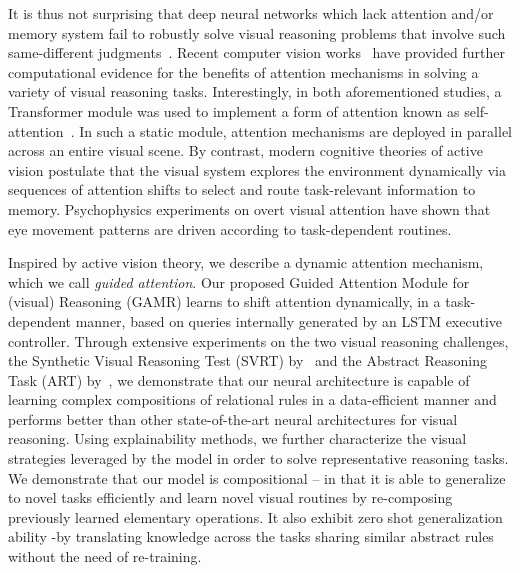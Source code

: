 It is thus not surprising that deep neural networks which lack attention and/or memory system fail to robustly solve visual reasoning problems that involve such same-different judgments~\citep{kim2018not}. Recent computer vision works~\citep{messina2021recurrent,vaishnav2021understanding} have provided further computational evidence for the benefits of attention mechanisms in solving a variety of visual reasoning tasks. Interestingly, in both aforementioned studies, a Transformer module was used to implement a form of attention known as self-attention~\citep{cheng2016long,parikh-etal-2016-decomposable}. In such a static module, attention mechanisms are deployed in parallel across an entire visual scene. By contrast, modern cognitive theories of active vision postulate that the visual system explores the environment dynamically  via sequences of attention shifts to select and route task-relevant information to memory. 
Psychophysics experiments \citep{hayhoe2000vision} on overt visual attention have shown that eye movement patterns are driven according to task-dependent routines. %


Inspired by active vision theory, we describe a dynamic attention mechanism, which we call \textit{guided attention}. Our proposed Guided Attention Module for (visual) Reasoning (GAMR) learns to shift attention dynamically, in a task-dependent manner, based on queries internally generated by an LSTM executive controller. Through extensive experiments on the two visual reasoning challenges, the Synthetic Visual Reasoning Test (SVRT) by~\citet{fleuret2011comparing} and the Abstract Reasoning Task (ART) by~\citet{Webb2021EmergentST}, we demonstrate that our neural architecture is capable of learning complex compositions of relational rules in a data-efficient manner and performs better than other state-of-the-art neural architectures for visual reasoning. Using explainability methods, we further characterize the visual strategies leveraged by the model in order to solve representative reasoning tasks. We demonstrate that our model is compositional -- in that it is able to generalize to novel tasks efficiently and learn novel visual routines by re-composing previously learned elementary operations. It also exhibit zero shot generalization ability -by translating knowledge across the tasks sharing similar abstract rules without the need of re-training.


